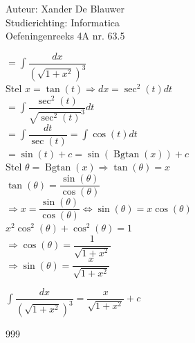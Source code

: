 \documentclass[a4paper]{article}
\begin{document}
\noindent \large Auteur: Xander De Blauwer \\
\noindent \large Studierichting: Informatica\\
\noindent \large Oefeningenreeks 4A nr. 63.5\\

\medskip

\normalsize


$ = \displaystyle\int \dfrac{dx}{(\sqrt{1+x^2})^3}$ \\

Stel $x = \tan(t) \Rightarrow dx = \sec^2(t)dt $ \\

$ = \displaystyle\int \dfrac{\sec^2(t)}{\sqrt{\sec^2(t)}^3}dt $ \\

$ = \displaystyle\int \dfrac{dt}{\sec(t)} = \displaystyle\int \cos(t)dt $ \\

$ = \sin(t) + c = \sin(\operatorname{Bgtan}(x)) + c $ \\

Stel $\theta = \operatorname{Bgtan}(x) \Rightarrow \tan(\theta) = x $ \\

$\tan(\theta) = \dfrac{\sin(\theta)}{\cos(\theta)} $ \\

$ \Rightarrow x = \dfrac{\sin(\theta)}{\cos(\theta)} \Leftrightarrow \sin(\theta) = x\cos(\theta) $ \\

$x^2\cos^2(\theta) + \cos^2(\theta) = 1 $ \\

$\Rightarrow \cos(\theta) = \dfrac{1}{\sqrt{1+x^2}}$ \\

$\Rightarrow \sin(\theta) = \dfrac{x}{\sqrt{1+x^2}}$

$\displaystyle\int \dfrac{dx}{(\sqrt{1+x^2})^3} = \dfrac{x}{\sqrt{1+x^2}} + c $ \\


\begin{thebibliography}{999}
\end{thebibliography}
\end{document}
